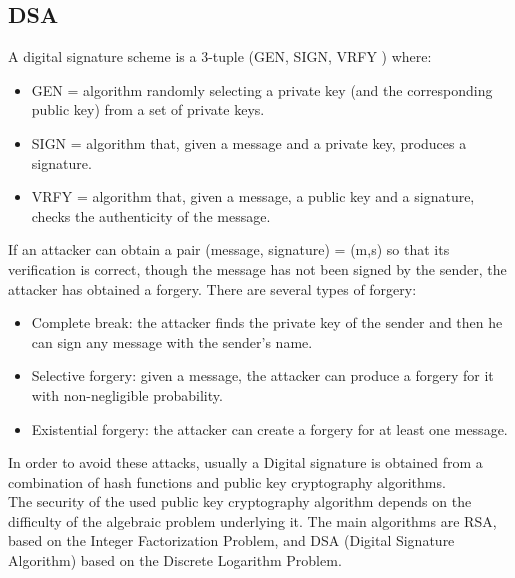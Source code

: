 \documentclass[a4paper, 10pt, titlepage]{article}
\begin{document}
\subsection{DSA}
A digital signature scheme is a 3-tuple (GEN, SIGN, VRFY ) where:
\begin{itemize}
\item GEN = algorithm randomly selecting a private key (and the corresponding public key) from a set of private keys.
\item SIGN = algorithm that, given a message and a private key, produces a signature.
\item VRFY = algorithm that, given a message, a public key and a signature, checks the authenticity of the message.
\end{itemize}
If an attacker can obtain a pair (message, signature) = (m,s) so that its verification is correct, though the message has not been signed by the sender, the attacker has obtained a forgery. There are several types of forgery:
\begin{itemize}
\item Complete break: the attacker finds the private key of the sender and then he can sign any message with the sender’s name.
\item Selective forgery: given a message, the attacker can produce a forgery for it with non-negligible probability.
\item Existential forgery: the attacker can create a forgery for at least one message.
\end{itemize}
In order to avoid these attacks, usually a Digital signature is obtained from a combination of hash functions and public key cryptography algorithms. \\
The security of the used public key cryptography algorithm depends on the difficulty of the algebraic problem underlying it. The main algorithms are RSA, based on the Integer Factorization Problem, and DSA (Digital Signature Algorithm) based on the Discrete Logarithm Problem.

\newpage %
\end{document}
